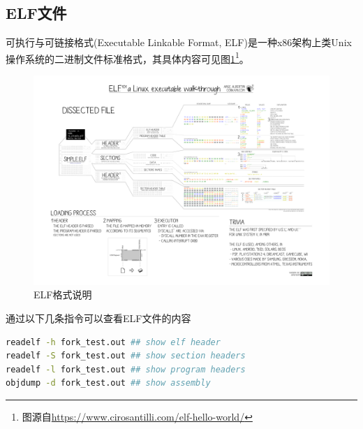 \documentclass[logo,reportComp]{thesis}
\begin{document}
\subsection{ELF文件}
可执行与可链接格式(Executable Linkable Format, ELF)是一种x86架构上类Unix操作系统的二进制文件标准格式，其具体内容可见图\ref{fig:elf}\footnote{图源自\url{https://www.cirosantilli.com/elf-hello-world/}}。
\begin{figure}[H]
\centering
\includegraphics[width=\linewidth]{fig/elf101.pdf}
\caption{ELF格式说明}
\label{fig:elf}
\end{figure}

通过以下几条指令可以查看ELF文件的内容
\begin{lstlisting}[language=bash]
readelf -h fork_test.out ## show elf header
readelf -S fork_test.out ## show section headers
readelf -l fork_test.out ## show program headers
objdump -d fork_test.out ## show assembly
\end{lstlisting}
\end{document}
